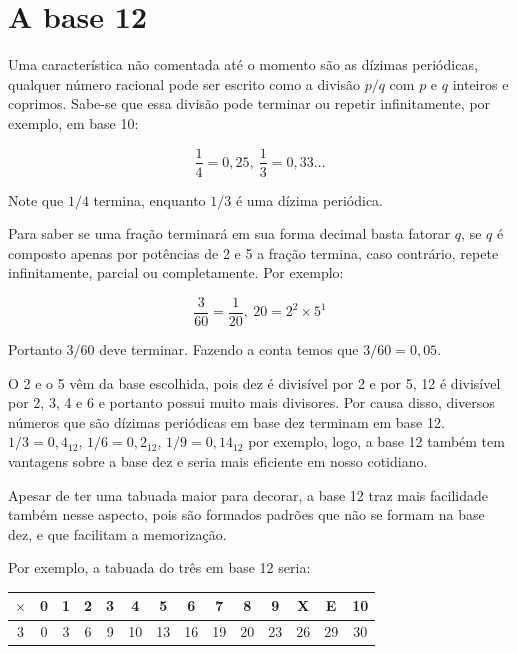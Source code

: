 \documentclass{report}
\theoremstyle{definition}
\begin{document}
\section{A base 12}

Uma característica não comentada até o momento são as dízimas periódicas, qualquer número racional pode ser escrito como a divisão $p/q$ com $p$ e $q$ inteiros e coprimos. Sabe-se que essa divisão pode terminar ou repetir infinitamente, por exemplo, em base 10:

\begin{equation*}
\frac{1}{4} = 0,25,\ \frac{1}{3} = 0,33\ldots
\end{equation*}

Note que $1/4$ termina, enquanto $1/3$ é uma dízima periódica.

Para saber se uma fração terminará em sua forma decimal basta fatorar $q$, se $q$ é composto apenas por potências de 2 e 5 a fração termina, caso contrário, repete infinitamente, parcial ou completamente. Por exemplo:

\begin{equation*}
\frac{3}{60} = \frac{1}{20},\ 20 = 2^2 \times 5^1
\end{equation*}

Portanto $3/60$ deve terminar. Fazendo a conta temos que $3/60=0,05$.

O 2 e o 5 vêm da base escolhida, pois dez é divisível por 2 e por 5, 12 é divisível por 2, 3, 4 e 6 e portanto possui muito mais divisores. Por causa disso, diversos números que são dízimas periódicas em base dez terminam em base 12. $1/3 = 0,4_{12}$, $1/6 = 0,2_{12}$, $1/9 = 0,14_{12}$ por exemplo, logo, a base 12 também tem vantagens sobre a base dez e seria mais eficiente em nosso cotidiano.

Apesar de ter uma tabuada maior para decorar, a base 12 traz mais facilidade também nesse aspecto, pois são formados padrões que não se formam na base dez, e que facilitam a memorização.

Por exemplo, a tabuada do três em base 12 seria:

\begin{center}
    \begin{tabular}{ c|c|c|c|c|c|c|c|c|c|c|c|c|c } 
        $\times$ & 0 & 1 & 2 & 3 & 4 & 5 & 6 & 7 & 8 & 9 & X & E & 10\\ 
        \hline
        3 & 0 & 3 & 6 & 9 & 10 & 13 & 16 & 19 & 20 & 23 & 26 & 29 & 30\\ 
    \end{tabular}
\end{center}
\end{document}
